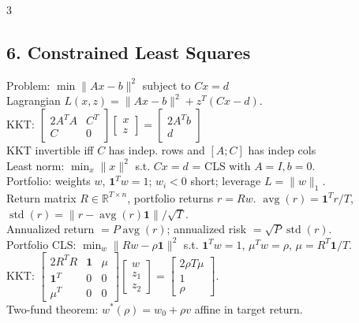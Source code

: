 \documentclass[8pt,landscape]{extarticle}
\newcommand{\R}{\mathbb{R}}
\newcommand{\norm}[1]{\|#1\|}
\newcommand{\1}{\mathbf{1}}
\newcommand{\0}{\mathbf{0}}
\begin{document}
\begin{multicols*}{3}
\subsection*{6. Constrained Least Squares}
Problem: $\min \norm{Ax-b}^2$ subject to $Cx=d$ \\
Lagrangian $L(x,z)=\|Ax-b\|^2+z^T(Cx-d)$. \\
KKT: $\begin{bmatrix}2A^TA & C^T \\ C & 0\end{bmatrix}\begin{bmatrix}x\\z\end{bmatrix} = \begin{bmatrix}2A^Tb\\d\end{bmatrix}$ \\
KKT invertible iff $C$ has indep. rows and $[A;C]$ has indep cols \\
Least norm: $\min_x\|x\|^2$ s.t. $Cx=d$ = CLS with $A=I,b=0$. \\
Portfolio: weights $w$, $\mathbf1^Tw=1$; $w_i<0$ short; leverage $L=\|w\|_1$. \\
Return matrix $R\in\R^{T\times n}$, portfolio returns $r=Rw$.
$\operatorname{avg}(r)=\mathbf1^Tr/T$, 
$\operatorname{std}(r)=\|r-\operatorname{avg}(r)\mathbf1\|/\sqrt T$. \\
Annualized return $=P\operatorname{avg}(r)$; annualized risk $=\sqrt P\operatorname{std}(r)$. \\
Portfolio CLS:
$\min_w\|Rw-\rho\mathbf1\|^2$
s.t. $\mathbf1^Tw=1$, $\mu^Tw=\rho$, $\mu=R^T\mathbf1/T$. \\
KKT:
$\begin{bmatrix}
2R^TR & \mathbf1 & \mu\\
\mathbf1^T & 0 & 0\\
\mu^T & 0 & 0
\end{bmatrix}
\begin{bmatrix}w\\z_1\\z_2\end{bmatrix}
=
\begin{bmatrix}2\rho T\mu\\1\\\rho\end{bmatrix}$. \\
Two-fund theorem: $w^*(\rho)=w_0+\rho v$ affine in target return.


\end{multicols*}
\end{document}
